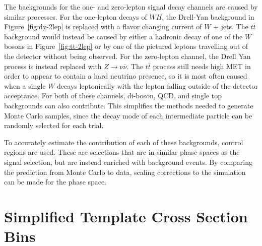 The backgrounds for the one- and zero-lepton signal decay channels are
caused by similar processes.
For the one-lepton decays of $WH$, the Drell-Yan background in Figure~\ref{fig:dy-2lep}
is replaced with a flavor changing current of $W$ + jets.
The $t\bar{t}$ background would instead be caused by either a hadronic decay of
one of the $W$ bosons in Figure~\ref{fig:tt-2lep}
or by one of the pictured leptons travelling out of the detector without being observed.
For the zero-lepton channel, the Drell Yan process is instead replaced with
$Z \rightarrow \nu\bar{\nu}$.
The $t\bar{t}$ process still needs high MET in order to appear to
contain a hard neutrino presence,
so it is most often caused when a single $W$ decays leptonically with the lepton
falling outside of the detector acceptance.
For both of these channels, di-boson, QCD, and single top backgrounds can also contribute.
This simplifies the methods needed to generate Monte Carlo samples,
since the decay mode of each intermediate particle can be randomly selected for each trial.

To accurately estimate the contribution of each of these backgrounds,
control regions are used.
These are selections that are in similar phase spaces as the signal selection,
but are instead enriched with background events.
By comparing the prediction from Monte Carlo to data,
scaling corrections to the simulation can be made for the phase space.

\section{Simplified Template Cross Section Bins}

